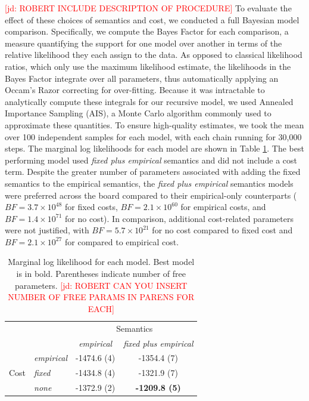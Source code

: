 \documentclass[11pt]{article}
\newcommand{\jd}[1]{\textcolor{Red}{[jd: #1]}}
\newcommand{\tableref}[1]{Table \ref{#1}}
\begin{document}
\jd{ROBERT INCLUDE DESCRIPTION OF PROCEDURE}
To evaluate the effect of these choices of semantics and cost, we conducted a full Bayesian model comparison.
Specifically, we compute the Bayes Factor for each comparison, a measure quantifying the support for one model over another in terms of the relative likelihood they each assign to the data.
As opposed to classical likelihood ratios, which only use the maximum likelihood estimate, the likelihoods in the Bayes Factor integrate over all parameters, thus automatically applying an Occam's Razor correcting for over-fitting. 
Because it was intractable to analytically compute these integrals for our recursive model, we used Annealed Importance Sampling (AIS), a Monte Carlo algorithm commonly used to approximate these quantities.
To ensure high-quality estimates, we took the mean over 100 independent samples for each model, with each chain running for 30,000 steps.
The marginal log likelihoods for each model are shown in \tableref{tab:exp2-modelcomparison}. 
The best performing model used \emph{fixed plus empirical} semantics and did not include a cost term. 
Despite the greater number of parameters associated with adding the fixed semantics to the empirical semantics, the \emph{fixed plus empirical} semantics models were preferred across the board compared to their empirical-only counterparts ($BF = 3.7 \times 10^{48}$ for fixed costs, $BF = 2.1 \times 10^{60}$ for empirical costs, and $BF = 1.4 \times 10^{71}$ for no cost). 
In comparison, additional cost-related parameters were not justified, with $BF = 5.7 \times 10^{21}$ for no cost compared to fixed cost and $BF = 2.1 \times 10^{27}$ for compared to empirical cost.

\begin{table}
\caption{Marginal log likelihood for each model. Best model is in bold. Parentheses indicate number of free parameters. \jd{ROBERT CAN YOU INSERT NUMBER OF FREE PARAMS IN PARENS FOR EACH}}
\centering
\begin{tabular}{l l c c }
\toprule
& & \multicolumn{2}{c}{Semantics}\\
& & \emph{empirical} & \emph{fixed plus empirical}\\
\midrule
\multirow{3}{*}{Cost} & \emph{empirical} & -1474.6 (4) & -1354.4 (7) \\
 & \emph{fixed} & -1434.8 (4) & -1321.9 (7) \\
 & \emph{none} & -1372.9 (2) & \textbf{-1209.8 (5)} \\ 
\bottomrule
\end{tabular}
\label{tab:exp2-modelcomparison}
\end{table}
\end{document}
